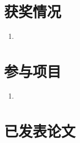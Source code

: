 
\begin{publications}
    \section*{获奖情况}
    \begin{enumerate}
        \item 
    \end{enumerate}

    \section*{参与项目}
    \begin{enumerate}
        \item 
    \end{enumerate}



\section*{已发表论文}




\end{publications}
